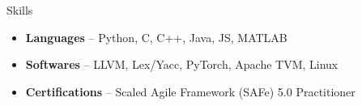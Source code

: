 \documentclass[]{mcdowellcv}
\begin{document}
	\begin{cvsection}{Skills}
		\begin{cvsubsection}{}{}{}	
			\small{
				\begin{itemize}
					\item \textbf{Languages} -- Python, C, C++, Java, JS, MATLAB
					\item \textbf{Softwares} -- LLVM, Lex/Yacc, PyTorch, Apache TVM, Linux
					\item \textbf{Certifications} -- Scaled Agile Framework (SAFe) 5.0 Practitioner
				\end{itemize}
			}
		\end{cvsubsection}
	\end{cvsection}
	
\end{document}
